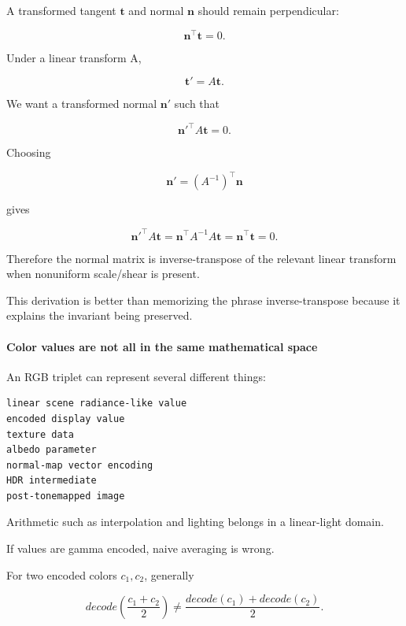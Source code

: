 \hypertarget{03-visual-computing-i-ch001-normals-cannot-always-use-the-same-matrix-as-positions}{}

A transformed tangent \(\mathbf t\) and normal \(\mathbf n\) should remain perpendicular:

\[
\mathbf n^\top\mathbf t=0.
\]

Under a linear transform A,

\[
\mathbf t'=A\mathbf t.
\]

We want a transformed normal \(\mathbf n'\) such that

\[
{\mathbf n'}^\top A\mathbf t=0.
\]

Choosing

\[
\mathbf n'=(A^{-1})^\top\mathbf n
\]

gives

\[
{\mathbf n'}^\top A\mathbf t
=
\mathbf n^\top A^{-1}A\mathbf t
=
\mathbf n^\top\mathbf t
=
0.
\]

Therefore the normal matrix is inverse-transpose of the relevant linear transform when nonuniform scale/shear is present.

This derivation is better than memorizing the phrase inverse-transpose because it explains the invariant being preserved.

\paragraph{Color values are not all in the same mathematical space}\label{03-visual-computing-i-ch001-color-values-are-not-all-in-the-same-mathematical-space}

\hypertarget{03-visual-computing-i-ch001-color-values-are-not-all-in-the-same-mathematical-space}{}

An RGB triplet can represent several different things:

\begin{verbatim}
linear scene radiance-like value
encoded display value
texture data
albedo parameter
normal-map vector encoding
HDR intermediate
post-tonemapped image
\end{verbatim}

Arithmetic such as interpolation and lighting belongs in a linear-light domain.

If values are gamma encoded, naive averaging is wrong.

For two encoded colors \(c_1,c_2\), generally

\[
decode\left(
\frac{c_1+c_2}{2}
\right)
\neq
\frac{decode(c_1)+decode(c_2)}{2}.
\]

